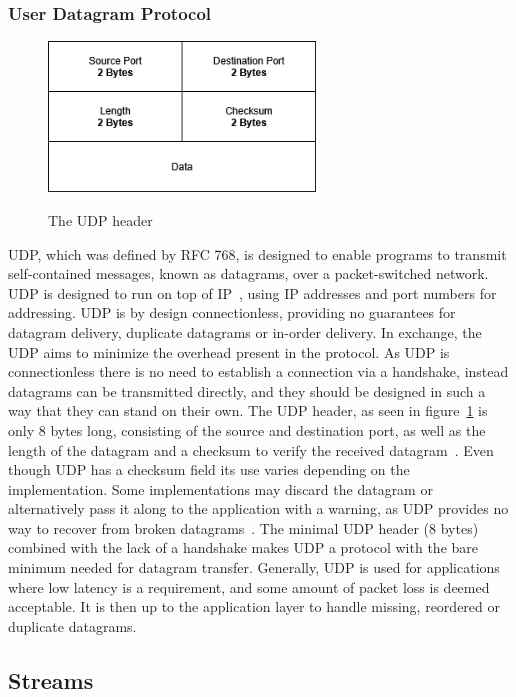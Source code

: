 \documentclass[english, 12pt, a4paper, elec, utf8, a-2b, online]{aaltothesis}
\begin{document}
\subsubsection{User Datagram Protocol \label{UDP}}
\label{sec:udp}
\begin{figure}[b]
	\centering
	\includegraphics[alt={A block diagram of the UDP header format, detailing its fields and their sizes.}, height=4cm]{./images/udp_header.png}
	\caption{The UDP header}
	\label{fig:udp_header}
\end{figure}
UDP, which was defined by RFC 768, is designed to
enable programs to transmit self-contained messages, known as datagrams, over a
packet-switched network. UDP is designed to run on top of IP~\cite{rfc791},
using IP addresses and port numbers for addressing. UDP is by design connectionless,
providing no guarantees for datagram delivery, duplicate datagrams or in-order
delivery. In exchange, the UDP aims to minimize the overhead present in the protocol.
As UDP is connectionless there is no need to establish a connection via a handshake,
instead datagrams can be transmitted directly, and they should be designed in
such a way that they can stand on their own. The UDP header, as seen in figure~\ref{fig:udp_header}
is only 8 bytes long,
consisting of the source and destination port, as well as the length of the datagram
and a checksum to verify the received datagram~\cite{rfc768}. Even though UDP has
a checksum field its use varies depending on the implementation. Some implementations
may discard the datagram or alternatively pass it along to the application with a 
warning, as UDP provides no way to recover from broken datagrams~\cite{compute_rnetworking}. The minimal UDP
header (8 bytes) combined with the lack of a handshake makes UDP a protocol with
the bare minimum needed for datagram transfer.
Generally, UDP is used for applications where low latency is a requirement, and some
amount of packet loss is deemed acceptable. It is then up to the application layer to
handle missing, reordered or duplicate datagrams.

\subsection{Streams}
\end{document}
